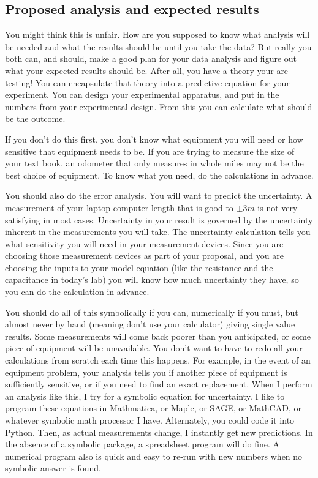 \subsection{Proposed analysis and expected results}

You might think this is unfair. How are you supposed to know what analysis will be needed and what the results should be until you take the data? But really you both can, and should, make a good plan for your data analysis and figure out what your expected results should be. After all, you have a theory your are testing! You can encapsulate that theory into a predictive equation for your experiment. You can design your experimental apparatus, and put in the numbers from your experimental design. From this you can calculate what should be the outcome.

If you don't do this first, you don't know what equipment you will need or how sensitive that equipment needs to be. If you are trying to measure the size of your text book, an odometer that only measures in whole miles may not be the best choice of equipment. To know what you need, do the calculations in advance.

You should also do the error analysis. You will want to predict the uncertainty. A measurement of your laptop computer length that is good to $\pm 3\unit{m}$ is not very satisfying in most cases. Uncertainty in your result is governed by the uncertainty inherent in the measurements you will take. The uncertainty calculation tells you what sensitivity you will need in your measurement devices. Since you are choosing those measurement devices as part of your proposal, and you are choosing the inputs to your model equation (like the resistance and the capacitance in today's lab) you will know how much uncertainty they have, so you can do the calculation in advance.

You should do all of this symbolically if you can, numerically if you must, but almost never by hand (meaning don't use your calculator) giving single value results. Some measurements will come back poorer than you anticipated, or some piece of equipment will be unavailable. You don't want to have to redo all your calculations from scratch each time this happens. For example, in the event of an equipment problem, your analysis tells you if another piece of equipment is sufficiently sensitive, or if you need to find an exact replacement. When I perform an analysis like this, I try for a symbolic equation for uncertainty. I like to program these equations in Mathmatica, or Maple, or SAGE, or MathCAD, or whatever symbolic math processor I have. Alternately, you could code it into Python. Then, as actual measurements change, I instantly get new predictions. In the absence of a symbolic package, a spreadsheet program will do fine. A numerical program also is quick and easy to re-run with new numbers when no symbolic answer is found.

